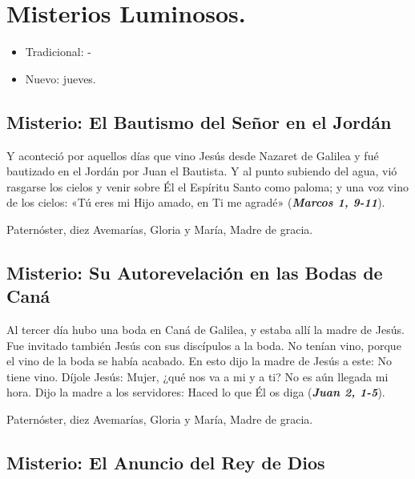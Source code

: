 \documentclass[./rosary.tex]{subfiles}
\newcounter{lux-counter}
\begin{document}
\section*{Misterios Luminosos.}
\begin{itemize}
      \item Tradicional: -
      \item Nuevo: jueves.
\end{itemize}

\subsection*{ Misterio: El Bautismo del Señor en el Jordán}

Y aconteció por aquellos días que vino Jesús desde Nazaret de Galilea y fué bautizado en el Jordán por Juan el Bautista. 
Y al punto subiendo del agua, vió rasgarse los cielos y venir sobre Él el Espíritu Santo como paloma; 
y una voz vino de los cielos: «Tú eres mi Hijo amado, en Ti me agradé» (\textbf{\emph{Marcos 1, 9-11}}).

\begin{center}
      Paternóster, diez Avemarías, Gloria y María, Madre de gracia.
\end{center}

\subsection*{ Misterio: Su Autorevelación en las Bodas de Caná}

Al tercer día hubo una boda en Caná de Galilea, y estaba allí la madre de Jesús. Fue invitado también Jesús con sus discípulos a la boda. 
No tenían vino, porque el vino de la boda se había acabado. En esto dijo la madre de Jesús a este: No tiene vino. 
Díjole Jesús: Mujer, ¿qué nos va a mi y a ti? No es aún llegada mi hora. Dijo la madre a los servidores: Haced lo que Él os diga (\textbf{\emph{Juan 2, 1-5}}).

\begin{center}
      Paternóster, diez Avemarías, Gloria y María, Madre de gracia.
\end{center}

\subsection*{ Misterio: El Anuncio del Rey de Dios}
\end{document}
